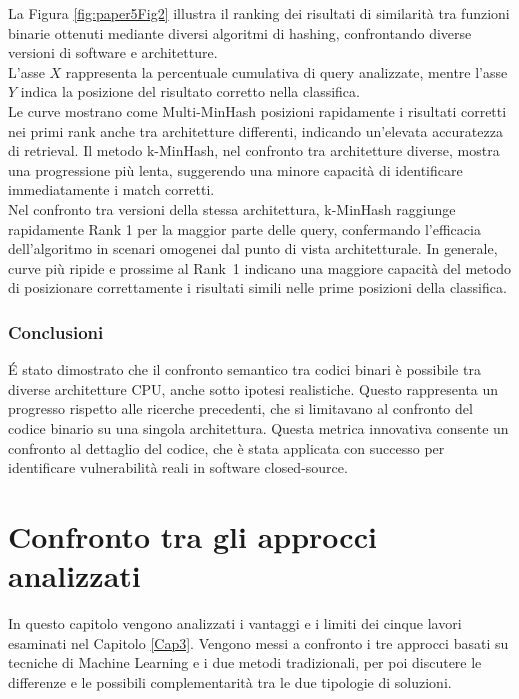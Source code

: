 \documentclass[12pt,a4paper,openright,twoside]{report}
\begin{document}
La Figura \ref{fig:paper5Fig2} illustra il ranking dei risultati di similarità tra funzioni binarie ottenuti mediante diversi algoritmi di hashing, confrontando diverse versioni di software e architetture.\\
L'asse $X$ rappresenta la percentuale cumulativa di query analizzate, mentre l'asse $Y$ indica la posizione del risultato corretto nella classifica.\\
Le curve mostrano come Multi-MinHash posizioni rapidamente i risultati corretti nei primi rank anche tra architetture differenti, indicando un'elevata accuratezza di retrieval. Il metodo k-MinHash, nel confronto tra architetture diverse, mostra una progressione più lenta, suggerendo una minore capacità di identificare immediatamente i match corretti.\\
Nel confronto tra versioni della stessa architettura, k-MinHash raggiunge rapidamente Rank 1 per la maggior parte delle query, confermando l'efficacia dell'algoritmo in scenari omogenei dal punto di vista architetturale. In generale, curve più ripide e prossime al Rank~1 indicano una maggiore capacità del metodo di posizionare correttamente i risultati simili nelle prime posizioni della classifica.


\subsection{Conclusioni}

É stato dimostrato che il confronto semantico tra codici binari è possibile tra diverse architetture CPU, anche sotto ipotesi realistiche. Questo rappresenta un progresso rispetto alle ricerche precedenti, che si limitavano al confronto del codice binario su una singola architettura. Questa metrica innovativa consente un confronto al dettaglio del codice, che è stata applicata con successo per identificare vulnerabilità reali in software closed-source. 

\clearpage{\pagestyle{empty}\cleardoublepage}

\chapter{Confronto tra gli approcci analizzati}\label{Cap4}

In questo capitolo vengono analizzati i vantaggi e i limiti dei cinque lavori esaminati nel Capitolo \ref{Cap3}. Vengono messi a confronto i tre approcci basati su tecniche di Machine Learning e i due metodi tradizionali, per poi discutere le differenze e le possibili complementarità tra le due tipologie di soluzioni.
\end{document}

